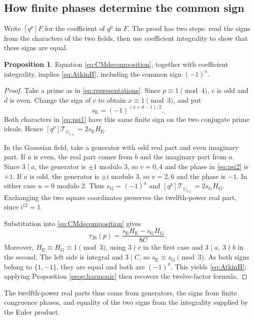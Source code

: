 \documentclass[a4paper,11pt]{article}
\theoremstyle{definition}
\newtheorem{proposition}{Proposition}[section]
\newcommand{\T}{\mathcal T}
\newcommand{\iu}{\mathrm i}
\begin{document}
\subsection{How finite phases determine the common sign}
Write \([q^p]F\) for the coefficient of \(q^p\) in \(F\).
The proof has two steps: read the signs from the characters of the two fields,
then use coefficient integrality to show that these signs are equal.
\begin{proposition}\label{prop:CMAtkin}
Equation \eqref{eq:CMdecomposition}, together with coefficient
integrality, implies \eqref{eq:AtkinH}, including the common sign
\((-1)^a\).
\end{proposition}
\begin{proof}
Take a prime as in \eqref{eq:representations}.
Since \(p\equiv1\pmod4\), \(c\) is odd and \(d\) is even.
Change the sign of \(c\) to obtain \(x\equiv1\pmod3\), and put
\[
 s_{\mathrm E}=(-1)^{(x+d-1)/2}.
\]
Both characters in \eqref{eq:psi1} have this same finite sign on the
two conjugate prime ideals. Hence
\([q^p]\T_{\psi_{1\pm}}=2s_{\mathrm E}H_{\mathrm E}\).

In the Gaussian field, take a generator with odd real part and even
imaginary part. If \(a\) is even, the real part comes from \(b\) and the
imaginary part from \(a\). Since \(3\mid a\), the generator is
\(\pm1\) modulo 3, so \(v=0,4\) and the phase in \eqref{eq:psi2}
is \(+1\). If \(a\) is odd, the generator is \(\pm\iu\) modulo 3,
so \(v=2,6\) and the phase is \(-1\).
In either case \(u=0\) modulo 2. Thus
\(s_{\mathrm G}=(-1)^a\) and
\([q^p]\T_{\psi_{2\pm}}=2s_{\mathrm G}H_{\mathrm G}\).
Exchanging the two square coordinates preserves the twelfth-power
real part, since \(\iu^{12}=1\).

Substitution into \eqref{eq:CMdecomposition} gives
\begin{equation}\label{eq:CMprimephase}
 \tau_{26}(p)=
 \frac{s_{\mathrm E}H_{\mathrm E}-s_{\mathrm G}H_{\mathrm G}}{8C}.
\end{equation}
Moreover, \(H_{\mathrm E}\equiv H_{\mathrm G}\equiv1\pmod3\),
using \(3\nmid c\) in the first case and \(3\mid a,\ 3\nmid b\)
in the second. The left side is integral and \(3\mid C\), so
\(s_{\mathrm E}\equiv s_{\mathrm G}\pmod3\).
As both signs belong to \(\{1,-1\}\), they are equal and both are
\((-1)^a\). This yields \eqref{eq:AtkinH}; applying
Proposition \ref{prop:harmonic} then recovers the twelve-factor formula.
\end{proof}
The twelfth-power real parts thus come from generators, the signs from
finite congruence phases, and equality of the two signs from the integrality
supplied by the Euler product.
\end{document}
